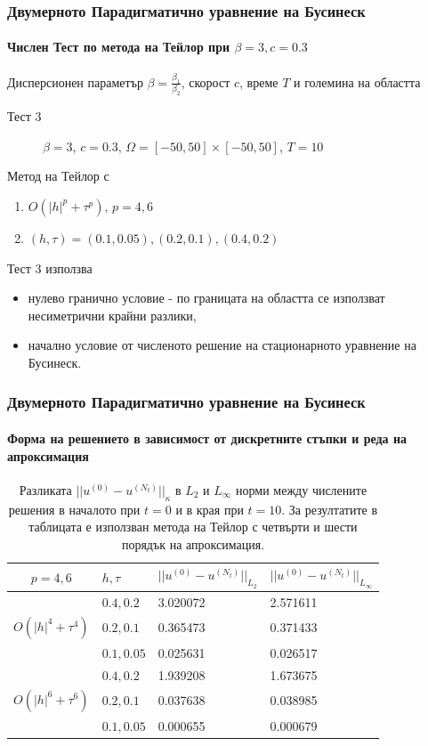 \documentclass{beamer}
\begin{document}
\begin{frame}
\frametitle{Двумерното Парадигматично уравнение на Бусинеск}
\framesubtitle{Числен Тест по метода на Тейлор при $\beta = 3, c=0.3$}

Дисперсионен параметър $\beta= \frac{\beta_1}{\beta_2}$, скорост $c$, време $T$ и големина на областта
\begin{description}
 \item[Тест 3] $\beta = 3$, $c = 0.3$, $\Omega = [-50, 50] \times [-50, 50]$, $T = 10$
\end{description}

Метод на Тейлор с 
\begin{enumerate}
  \item $O(|h|^p + \tau^p)$, $p = 4, 6$
  \item $(h, \tau)=(0.1, 0.05), (0.2, 0.1), (0.4, 0.2)$
\end{enumerate}

Тест 3 използва 
\begin{itemize} 
\item нулево гранично условие - по границата на областта се използват несиметрични крайни разлики,
\item начално условие от численото решение на стационарното уравнение на Бусинеск.
\end{itemize}
\end{frame}


\begin{frame}
\frametitle{Двумерното Парадигматично уравнение на Бусинеск}
\framesubtitle{Форма на решението в зависимост от дискретните стъпки и реда на апроксимация}

\begin{table}[ht]
\centering
\small
		\begin{tabular}{||c|l|l|l||}
			\hline
			\hline
  $p=4,6$   &  $h, \tau$ &  $||u^{(0)} - u^{(N_t)}||_{L_2}$  & $||u^{(0)} - u^{(N_t)}||_{L_\infty}$   \\
   		      \hline 
			\hline
           				& $0.4, 0.2$   &  3.020072 & 2.571611     \\
			\hline 
  $O(|h|^4+\tau^4)$ & $0.2, 0.1$   & 0.365473 & 0.371433      \\
			\hline 
           				& $0.1, 0.05$ & 0.025631 & 0.026517      \\
	   \hline
          \hline
           				& $0.4, 0.2$   & 1.939208 & 1.673675      \\
			\hline
  $O(|h|^6+\tau^6)$ & $0.2, 0.1$   & 0.037638 & 0.038985      \\
    \hline
           				& $0.1, 0.05$  & 0.000655 & 0.000679       \\
	   \hline
		\hline 
		\end{tabular}
		\caption{Разликата $||u^{(0)} - u^{(N_t)}||_\kappa$ в $L_2$ и $L_\infty$ норми между числените решения в началото при $t=0$ и в края при $t=10$. За резултатите в таблицата е използван метода на Тейлор с четвърти и шести порядък на апроксимация. }
\label{tableK}
\end{table}

\end{frame}
\end{document}
